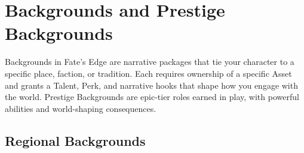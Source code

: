 \documentclass[12pt]{article}
\begin{document}
\section*{Backgrounds and Prestige Backgrounds}

Backgrounds in Fate's Edge are narrative packages that tie your character to a specific place, faction, or tradition. Each requires ownership of a specific Asset and grants a Talent, Perk, and narrative hooks that shape how you engage with the world. Prestige Backgrounds are epic-tier roles earned in play, with powerful abilities and world-shaping consequences.

\subsection*{Regional Backgrounds}
\end{document}
